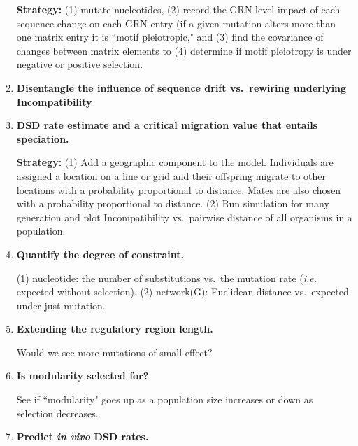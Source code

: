 \documentclass[a4paper, 11 pt]{article}
\begin{document}
\begin{enumerate}
    \textbf{Strategy:} (1) mutate nucleotides, (2) record the GRN-level impact of each sequence change on each GRN entry (if a given mutation alters more than one matrix entry it is ``motif pleiotropic," and (3) find the covariance of changes between matrix elements to (4) determine if motif pleiotropy is under negative or positive selection.

  \item \textbf{Disentangle the influence of sequence drift vs.\ rewiring underlying Incompatibility}

  \item \textbf{DSD rate estimate and a critical migration value that entails speciation.}

    \textbf{Strategy:} (1) Add a geographic component to the model. Individuals are assigned a location on a line or grid and their offspring migrate to other locations with a probability proportional to distance. Mates are also chosen with a probability proportional to distance. (2) Run simulation for many generation and plot Incompatibility vs.\ pairwise distance of all organisms in a population.

  \item \textbf{Quantify the degree of constraint.} 
    
    (1) nucleotide: the number of substitutions vs.\ the mutation rate (\emph{i.e.} expected without selection). (2) network(G): Euclidean distance vs.\ expected under just mutation. 

  \item \textbf{Extending the regulatory region length.}
    
    Would we see more mutations of small effect?

  \item \textbf{Is modularity selected for?} 

    See if ``modularity" goes up as a population size increases or down as selection decreases. 

  \item \textbf{Predict \emph{in vivo} DSD rates.}
\end{enumerate}
\end{document}
